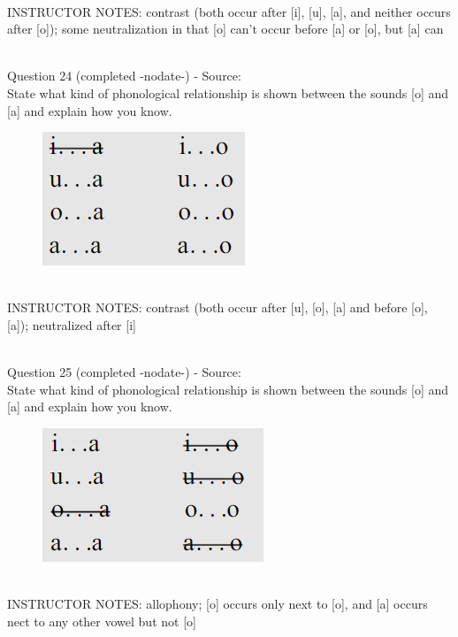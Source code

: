 \documentclass[12pt]{article}
\begin{document}
~\\
INSTRUCTOR NOTES: contrast (both occur after [i], [u], [a], and neither occurs after [o]); some neutralization in that [o] can't occur before [a] or [o], but [a] can


~\\

{\large Question 24} (completed -nodate-) - Source: \\

State what kind of phonological relationship is shown between the sounds [o] and [a] and explain how you know.\\

\begin{figure}[H]
\includegraphics{../images/peng70ao_b.png}
\end{figure}

~\\
INSTRUCTOR NOTES: contrast (both occur after [u], [o], [a] and before [o], [a]); neutralized after [i]


~\\

{\large Question 25} (completed -nodate-) - Source: \\

State what kind of phonological relationship is shown between the sounds [o] and [a] and explain how you know.\\

\begin{figure}[H]
\includegraphics{../images/peng70ao_c.png}
\end{figure}

~\\
INSTRUCTOR NOTES: allophony; [o] occurs only next to [o], and [a] occurs nect to any other vowel but not [o]
\end{document}
